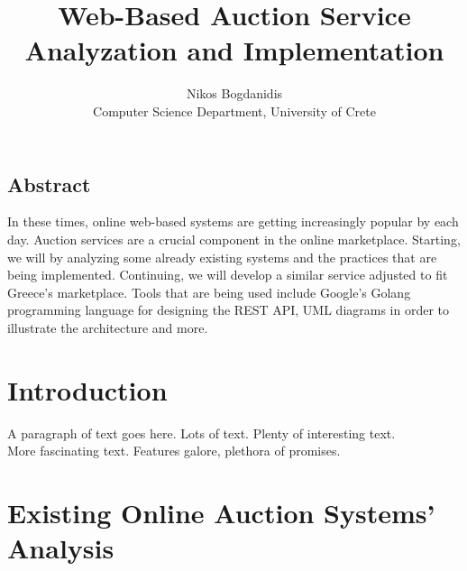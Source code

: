\documentclass[letterpaper,twocolumn,10pt]{article}
\begin{document}
\date{}

\title{\Large \bf Web-Based Auction Service Analyzation and Implementation}

\author{
{\rm Nikos Bogdanidis}\\
Computer Science Department, University of Crete
}

\maketitle

\thispagestyle{empty}


\subsection*{Abstract}
In these times, online web-based systems are getting increasingly popular by each day. Auction services are a crucial component in the online marketplace. Starting, we will by analyzing some already existing systems and the practices that are being implemented. Continuing, we will develop a similar service adjusted to fit Greece's marketplace. Tools that are being used include Google's Golang programming language for designing the REST API, UML diagrams in order to illustrate the architecture and more.

\section{Introduction}

A paragraph of text goes here.  Lots of text.  Plenty of interesting
text. \\

More fascinating text. Features galore, plethora of promises.\\

\section{Existing Online Auction Systems' Analysis}
\end{document}

